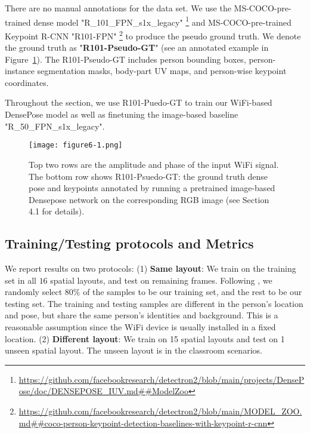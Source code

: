 \documentclass[sigconf, anonymous=false]{acmart}
\newcommand{\fer}[1]{\textcolor{blue}{[Fernando: #1]}}
\newcommand{\dong}[1]{\textcolor{green}{[Dong: #1]}}
\begin{document}
There are no manual annotations for the data set. We use the MS-COCO-pre-trained dense model "R\_101\_FPN\_s1x\_legacy" \footnote{\url{https://github.com/facebookresearch/detectron2/blob/main/projects/DensePose/doc/DENSEPOSE_IUV.md##ModelZoo}} and  MS-COCO-pre-trained Keypoint R-CNN "R101-FPN" \footnote{\url{https://github.com/facebookresearch/detectron2/blob/main/MODEL_ZOO.md##coco-person-keypoint-detection-baselines-with-keypoint-r-cnn}} to produce the pseudo ground truth. We denote the ground truth as "\textbf{R101-Pseudo-GT}" (see an annotated example in Figure~\ref{fig:annotation}). The R101-Pseudo-GT includes person bounding boxes, person-instance segmentation masks, body-part UV maps, and person-wise keypoint coordinates. 

Throughout the section, we use R101-Puedo-GT to train our WiFi-based DensePose model as well as finetuning the image-based baseline "R\_50\_FPN\_s1x\_legacy". 

\begin{figure}[!htb]
\centering
\texttt{[image: figure6-1.png]}
\caption{Top two rows are the amplitude and phase of the input WiFi signal. The bottom row shows R101-Psuedo-GT: the ground truth dense pose and keypoints annotated by running a pretrained image-based Densepose network on the corresponding RGB image (see Section 4.1 for details).}
\label{fig:annotation}
\end{figure}


\subsection{Training/Testing protocols and Metrics}
We report results on two protocols: (1) 
\textbf{Same layout}: We train on the training set in all $16$ spatial layouts, and test on remaining frames. Following \cite{Wanghuang2019}, we randomly select 80$\%$ of the samples to be our training set, and the rest to be our testing set. The training and testing samples are different in the person's location and pose, but share the same person's identities and background. This is a reasonable assumption since the WiFi device is usually installed in a fixed location. (2) \textbf{Different layout}: We train on 15 spatial layouts and test on 1 unseen spatial layout. The unseen layout is in the classroom scenarios.  
\end{document}
